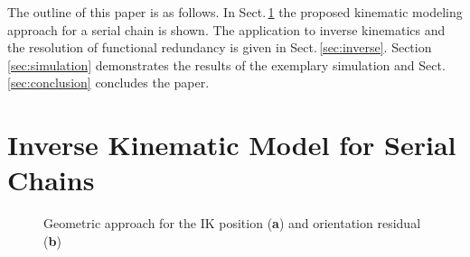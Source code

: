 \documentclass[graybox,vecphys]{svmult}
\begin{document}
The outline of this paper is as follows. In Sect.\,\ref{sec:model} the proposed kinematic modeling approach for a serial chain is shown. 
The application to inverse kinematics and the resolution of functional redundancy is given in Sect.\,\ref{sec:inverse}. 
Section\,\ref{sec:simulation} demonstrates the results of the exemplary simulation and Sect.\,\ref{sec:conclusion} concludes the paper.

\section{Inverse Kinematic Model for Serial Chains}
\label{sec:model}

\begin{figure}[tb]
\centering

\caption{Geometric approach for the IK position (\textbf{a}) and orientation residual (\textbf{b})}
\label{fig:geometry_sketch}
\end{figure}
\end{document}
